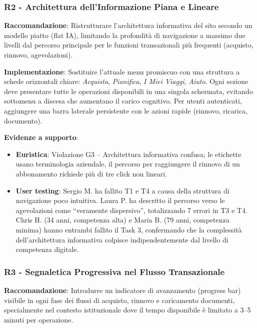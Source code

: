 \documentclass[11pt,a4paper]{article}
\begin{document}
\subsubsection{R2 - Architettura dell'Informazione Piana e Lineare}
\label{rec:R2}

\textbf{Raccomandazione}: Ristrutturare l’architettura informativa del sito
secondo un modello piatto (flat IA), limitando la profondit\`a di navigazione
a massimo due livelli dal percorso principale per le funzioni transazionali
pi\`u frequenti (acquisto, rinnovo, agevolazioni).

\textbf{Implementazione}: Sostituire l’attuale menu promiscuo con una
struttura a schede orizzontali chiare: \textit{Acquista}, \textit{Pianifica},
\textit{I Miei Viaggi}, \textit{Aiuto}. Ogni sezione deve presentare tutte le
operazioni disponibili in una singola schermata, evitando sottomenu a discesa
che aumentano il carico cognitivo. Per utenti autenticati, aggiungere una
barra laterale persistente con le azioni rapide (rinnovo, ricarica, documento).

\textbf{Evidenze a supporto}:
\begin{itemize}
    \item \textbf{Euristica}: Violazione G3 -- Architettura informativa
    confusa; le etichette usano terminologia aziendale, il percorso per
    raggiungere il rinnovo di un abbonamento richiede pi\`u di tre click
    non lineari.
    \item \textbf{User testing}: Sergio M. ha fallito T1 e T4 a causa
    della struttura di navigazione poco intuitiva. Laura P. ha descritto
    il percorso verso le agevolazioni come ``veramente dispersivo'',
    totalizzando 7 errori in T3 e T4. Chris H. (34 anni, competenza
    alta) e Maria B. (79 anni, competenza minima) hanno entrambi fallito
    il Task 3, confermando che la complessit\`a dell'architettura
    informativa colpisce indipendentemente dal livello di competenza
    digitale.
\end{itemize}

\subsubsection{R3 - Segnaletica Progressiva nel Flusso Transazionale}
\label{rec:R3}

\textbf{Raccomandazione}: Introdurre un indicatore di avanzamento
(progress bar) visibile in ogni fase dei flussi di acquisto, rinnovo e
caricamento documenti, specialmente nel contesto istituzionale dove il tempo
disponibile \`e limitato a 3--5 minuti per operazione.
\end{document}
